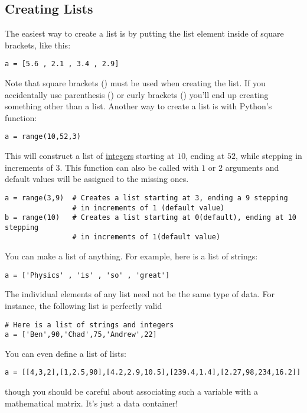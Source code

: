 \subsection*{Creating Lists}
The easiest way to create  a list is by putting the list element
inside of square brackets, like this:
\begin{Verbatim}
a = [5.6 , 2.1 , 3.4 , 2.9]
\end{Verbatim}
Note that square brackets (\code{[]}) must be used when creating the
list. If you accidentally use parenthesis (\code{()})  or curly brackets (\code{\{\}}) you'll end up creating
something other than a list.
Another way to create a list is with
Python's  function:
\begin{Verbatim}
a = range(10,52,3)
\end{Verbatim}
This will construct a list of \ul{integers} starting at $10$, ending at
$52$, while stepping in increments of $3$. This function can also be
called with $1$ or $2$ arguments and default values will be assigned
to the missing ones.
\begin{Verbatim}
a = range(3,9)  # Creates a list starting at 3, ending a 9 stepping
                # in increments of 1 (default value)
b = range(10)   # Creates a list starting at 0(default), ending at 10
stepping
                # in increments of 1(default value)
\end{Verbatim}
\noindent You can make a list of anything.  For example, here is a
list of strings:
\begin{Verbatim}
a = ['Physics' , 'is' , 'so' , 'great']
\end{Verbatim}
The individual elements of any list need not be the same type of
data.  For instance, the following list is perfectly valid
\begin{Verbatim}
# Here is a list of strings and integers
a = ['Ben',90,'Chad',75,'Andrew',22]
\end{Verbatim}
You can even define a list of lists:
\begin{Verbatim}
a = [[4,3,2],[1,2.5,90],[4.2,2.9,10.5],[239.4,1.4],[2.27,98,234,16.2]]
\end{Verbatim}
though you should be careful about associating such a variable with a
mathematical matrix.  It's just a data container!
